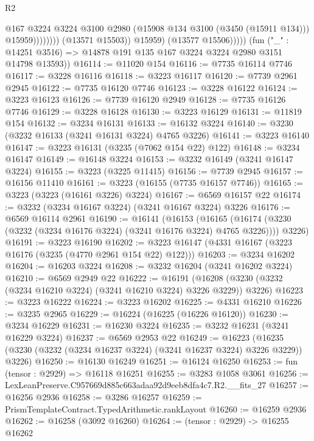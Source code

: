 \begin{lexlean}{R2}
\begin{coremodule}
                                  @167
                                  @3224
                                  @3224
                                  @3100
                                  @2980
                                  (@15908 @134 @3100 (@3450 (@15911 @134)))
                                  @15959))))))))
                  (@13571 @15503))
                @15959)
              (@13577 @15506)))))
      (fun ("_" : @14251 @3516) => @14878 @191 @135 @167 @3224 @3224 @2980 @3151 @14798 @13593))
@16114 := @11020 @154
@16116 := @7735 @16114 @7746
@16117 := @3228 @16116
@16118 := @3223 @16117
@16120 := @7739 @2961 @2945
@16122 := @7735 @16120 @7746
@16123 := @3228 @16122
@16124 := @3223 @16123
@16126 := @7739 @16120 @2949
@16128 := @7735 @16126 @7746
@16129 := @3228 @16128
@16130 := @3223 @16129
@16131 := @11819 @154
@16132 := @3234 @16131
@16133 := @16132 @3224
@16140 := @3230 (@3232 @16133 (@3241 @16131 @3224) @4765 @3226)
@16141 := @3223 @16140
@16147 := @3223 @16131 (@3235 (@7062 @154 @22) @122)
@16148 := @3234 @16147
@16149 := @16148 @3224
@16153 := @3232 @16149 (@3241 @16147 @3224)
@16155 := @3223 (@3225 @11415)
@16156 := @7739 @2945
@16157 := @16156 @11410
@16161 := @3223 (@16155 (@7735 @16157 @7746))
@16165 := @3223 (@3223 (@16161 @3226) @3224)
@16167 := @6569 @16157 @22
@16174 := @3232 (@3234 @16167 @3224) (@3241 @16167 @3224) @3226
@16176 := @6569 @16114 @2961
@16190 := @16141
    (@16153
      (@16165 (@16174 (@3230 (@3232 (@3234 @16176 @3224) (@3241 @16176 @3224) @4765 @3226))))
      @3226)
@16191 := @3223 @16190
@16202 := @3223 @16147 (@4331 @16167 (@3223 @16176 (@3235 (@4770 @2961 @154 @22) @122)))
@16203 := @3234 @16202
@16204 := @16203 @3224
@16208 := @3232 @16204 (@3241 @16202 @3224)
@16210 := @6569 @2949 @22
@16222 := @16191
    (@16208 (@3230 (@3232 (@3234 @16210 @3224) (@3241 @16210 @3224) @3226 @3229)) @3226)
@16223 := @3223 @16222
@16224 := @3223 @16202
@16225 := @4331 @16210
@16226 := @3235 @2965
@16229 := @16224 (@16225 (@16226 @16120))
@16230 := @3234 @16229
@16231 := @16230 @3224
@16235 := @3232 @16231 (@3241 @16229 @3224)
@16237 := @6569 @2953 @22
@16249 := @16223
    (@16235 (@3230 (@3232 (@3234 @16237 @3224) (@3241 @16237 @3224) @3226 @3229)) @3226)
@16250 := @16130 @16249
@16251 := @16124 @16250
@16253 := fun (tensor : @2929) => @16118 @16251
@16255 := @3283 @1058 @3061
@16256 := LexLeanPreserve.C957669d885c663adaa92d9eeb8dfa4c7.R2.__fits_27
@16257 := @16256 @2936
@16258 := @3286 @16257
@16259 := PrismTemplateContract.TypedArithmetic.rankLayout
@16260 := @16259 @2936
@16262 := @16258 (@3092 @16260)
@16264 := (tensor : @2929) -> @16255 @16262

\end{coremodule}
\end{lexlean}

